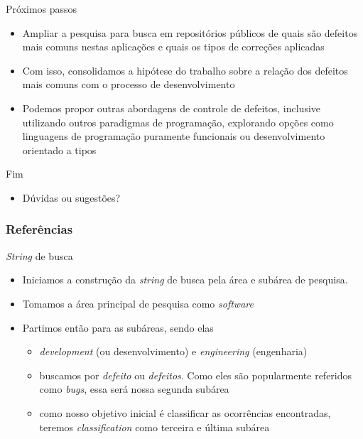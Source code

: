 \documentclass[brazilian]{beamer}
\begin{document}
\begin{frame}{Próximos passos}
    \begin{itemize}
        \item Ampliar a pesquisa para busca em repositórios públicos de quais são defeitos mais comuns nestas aplicações e quais os tipos de correções aplicadas
        \item Com isso, consolidamos a hipótese do trabalho sobre a relação dos defeitos mais comuns com o processo de desenvolvimento
        \item Podemos propor outras abordagens de controle de defeitos, inclusive utilizando outros paradigmas de programação, explorando opções como linguagens de programação puramente funcionais ou desenvolvimento orientado a tipos
    \end{itemize}
\end{frame}

\begin{frame}{Fim}
    \begin{itemize}
        \centering
        \item Dúvidas ou sugestões?
    \end{itemize}
\end{frame}

\begin{frame}[allowframebreaks]
    \frametitle{Referências}
    
    
\end{frame}

\appendix
\begin{frame}{\textit{String} de busca}
    \begin{itemize}
        \item Iniciamos a construção da \textit{string} de busca pela área e subárea de pesquisa. 
        \item Tomamos a área principal de pesquisa como \emph{software}
        \item Partimos então para as subáreas, sendo elas
        \begin{itemize}
            \item \emph{development} (ou desenvolvimento) e \emph{engineering} (engenharia)
            \item buscamos por \emph{defeito} ou \emph{defeitos}. Como eles são popularmente referidos como \emph{bugs}, essa será nossa segunda subárea
            \item como nosso objetivo inicial é classificar as ocorrências encontradas, teremos \emph{classification} como terceira e última subárea
        \end{itemize}
    \end{itemize}
\end{frame}
\end{document}
